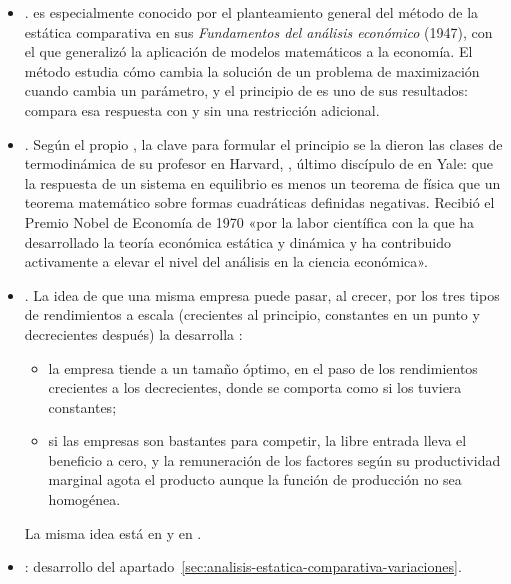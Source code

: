 \documentclass[11pt]{article}
\begin{document}
\begin{itemize}
\item {}.  es especialmente conocido por el planteamiento general del método de la estática comparativa en sus \emph{Fundamentos del análisis económico} (1947), con el que generalizó la aplicación de modelos matemáticos a la economía. El método estudia cómo cambia la solución de un problema de maximización cuando cambia un parámetro, y el principio de  es uno de sus resultados: compara esa respuesta con y sin una restricción adicional.
\item {}. Según el propio , la clave para formular el principio se la dieron las clases de termodinámica de su profesor en Harvard, , último discípulo de  en Yale: que la respuesta de un sistema en equilibrio es menos un teorema de física que un teorema matemático sobre formas cuadráticas definidas negativas\nocite{Samuelson1970Maximum,Backhouse2015Revisiting}. Recibió el Premio Nobel de Economía de 1970 «por la labor científica con la que ha desarrollado la teoría económica estática y dinámica y ha contribuido activamente a elevar el nivel del análisis en la ciencia económica»\nocite{Nobel1970Samuelson}.
\item {}. La idea de que una misma empresa puede pasar, al crecer, por los tres tipos de rendimientos a escala (crecientes al principio, constantes en un punto y decrecientes después) la desarrolla \textcite{Wicksell1901Forelasningar}:
  \begin{itemize}
  \item la empresa tiende a un tamaño óptimo, en el paso de los rendimientos crecientes a los decrecientes, donde se comporta como si los tuviera constantes;
  \item si las empresas son bastantes para competir, la libre entrada lleva el beneficio a cero, y la remuneración de los factores según su productividad marginal agota el producto aunque la función de producción no sea homogénea\nocite{Wicksell1934Lectures,Humphrey1997Algebraic}.
  \end{itemize}
  La misma idea está en  y en .
\item {}: desarrollo del apartado~\ref{sec:analisis-estatica-comparativa-variaciones}.
  \begin{itemize}

\end{itemize}
\end{itemize}
\end{document}
